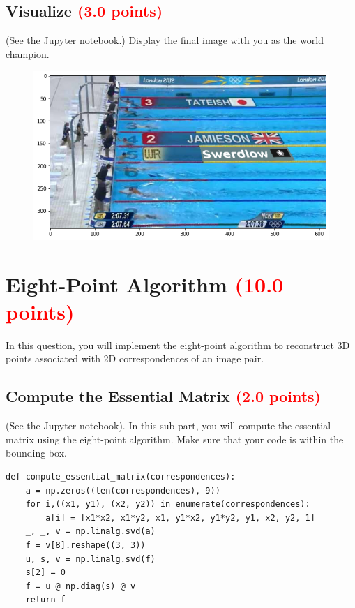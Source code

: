 \documentclass[answers]{exam}
\newcommand{\mypoints}[1]{\textcolor{red}{(#1 points)}}
\begin{document}
\subsection{Visualize \mypoints{3.0}}
(See the Jupyter notebook.)
Display the final image with you as the world champion.

\begin{solution}
    \begin{figure}[H]
        \centering
        \includegraphics[width=\linewidth]{Data/Solutions/question_4.png}
    \end{figure}
\end{solution}

\newpage
\section{Eight-Point Algorithm \mypoints{10.0}}

In this question, you will implement the eight-point algorithm to reconstruct 3D points associated with 2D correspondences of an image pair.

\subsection{Compute the Essential Matrix \mypoints{2.0}}
(See the Jupyter notebook). In this sub-part, you will compute the essential matrix using the eight-point algorithm. Make sure that your code is within the bounding box.
\begin{solution}
    \begin{verbatim}
def compute_essential_matrix(correspondences):
    a = np.zeros((len(correspondences), 9))
    for i,((x1, y1), (x2, y2)) in enumerate(correspondences):
        a[i] = [x1*x2, x1*y2, x1, y1*x2, y1*y2, y1, x2, y2, 1]
    _, _, v = np.linalg.svd(a)
    f = v[8].reshape((3, 3))
    u, s, v = np.linalg.svd(f)
    s[2] = 0
    f = u @ np.diag(s) @ v
    return f
    \end{verbatim}
\end{solution}
\end{document}
